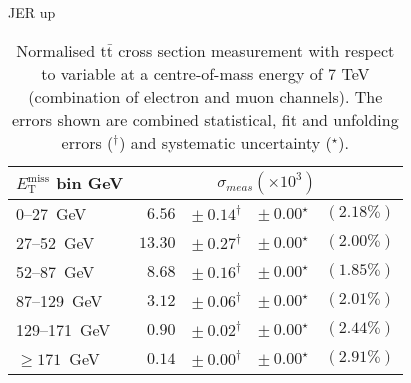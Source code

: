 \documentclass{article}
\newcommand{\ttbar}{\ensuremath{\text{t}\bar{\text{t}}}\xspace}
\newcommand{\GeV}{GeV}
\begin{document}
JER up
\begin{table}[H]
\setlength{\tabcolsep}{2pt}
\centering
\caption{Normalised \ttbar cross section measurement with respect to \MET variable
at a centre-of-mass energy of 7 TeV (combination of electron and muon channels). The errors shown are combined statistical, fit and unfolding errors ($^\dagger$) and systematic uncertainty ($^\star$).}
\label{tab:MET_xsections_7TeV_JER_up_combined}
\begin{tabular}{lrrrr}
\hline
$E_{\mathrm{T}}^{\mathrm{miss}}$ bin GeV & \multicolumn{4}{c}{$\sigma_{meas} \left(\times 10^{3}\right)$}\\ 
\hline
0--27~\GeV &  $6.56$ & $ \pm~ 0.14^\dagger$ & $ \pm~ 0.00^\star$ & $(2.18\%)$\\ 
27--52~\GeV &  $13.30$ & $ \pm~ 0.27^\dagger$ & $ \pm~ 0.00^\star$ & $(2.00\%)$\\ 
52--87~\GeV &  $8.68$ & $ \pm~ 0.16^\dagger$ & $ \pm~ 0.00^\star$ & $(1.85\%)$\\ 
87--129~\GeV &  $3.12$ & $ \pm~ 0.06^\dagger$ & $ \pm~ 0.00^\star$ & $(2.01\%)$\\ 
129--171~\GeV &  $0.90$ & $ \pm~ 0.02^\dagger$ & $ \pm~ 0.00^\star$ & $(2.44\%)$\\ 
$\geq 171$~\GeV &  $0.14$ & $ \pm~ 0.00^\dagger$ & $ \pm~ 0.00^\star$ & $(2.91\%)$\\ 
\hline 
\end{tabular}
\end{table}
\end{document}

